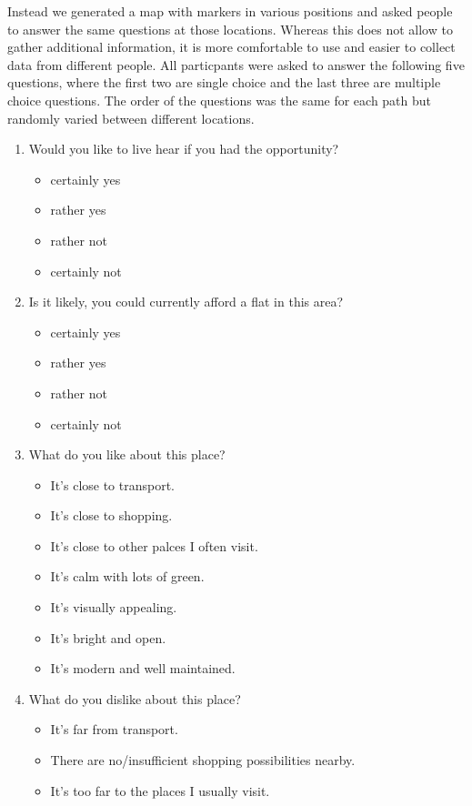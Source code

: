 \documentclass[letterpaper]{article}
\begin{document}
Instead we generated a map with markers in various positions and asked people to answer the same questions at those locations. Whereas this does not allow to gather additional information, it is more comfortable to use and easier to collect data from different people. All particpants were asked to answer the following five questions, where the first two are single choice and the last three are multiple choice questions. The order of the questions was the same for each path but randomly varied between different locations.
\begin{enumerate}
	\item Would you like to live hear if you had the opportunity?
	\begin{itemize}
		\item certainly yes
		\item rather yes
		\item rather not
		\item certainly not
	\end{itemize}
	\item Is it likely, you could currently afford a flat in this area?
	\begin{itemize}
		\item certainly yes
		\item rather yes
		\item rather not
		\item certainly not
	\end{itemize}
	\item What do you like about this place?
	\begin{itemize}
		\item It's close to transport.
		\item It's close to shopping.
		\item It's close to other palces I often visit.
		\item It's calm with lots of green.
		\item It's visually appealing.
		\item It's bright and open.
		\item It's modern and well maintained.
	\end{itemize}
	\item What do you dislike about this place?
	\begin{itemize}
		\item It's far from transport.
		\item There are no/insufficient shopping possibilities nearby.
		\item It's too far to the places I usually visit.

\end{itemize}
\end{enumerate}
\end{document}
